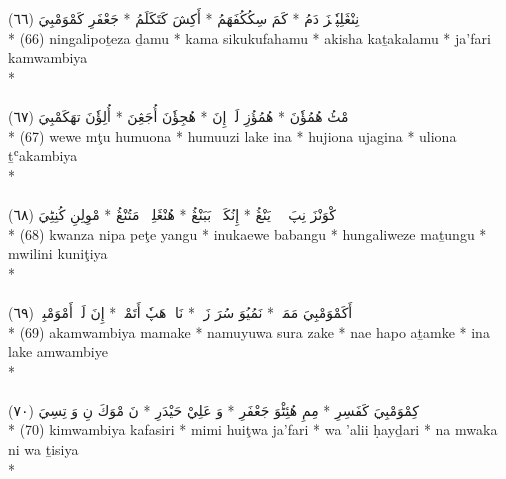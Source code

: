 \documentclass[a4paper, 12pt]{report}
\begin{document}
\begin{center}
\textarabic{(٦٦) \textcolor{mygreen}{نِنْڠَلِپٗتٖزَ دَمُ  * كَمَ سِكُكُفَهَمُ  * أَكِشَ كَتَكَلَمُ  * جَعْفَرِ كَمْوَمْبِيَ }} \\* 
(66) ningalipoṯeza ḏamu  * kama sikukufahamu  * akisha kaṯakalamu  * ja'fari kamwambiya  \\* 
 \\ 
\\[8mm] 

\textarabic{(٦٧) \textcolor{mygreen}{وٖوٖ مْٹُ هُمُؤٗنَ  * هُمُؤُزِ لَكٖ إِنَ  * هُجِؤٗنَ أُجَڠِنَ  * أُلِؤٗنَ تهَكَمْبِيَ }} \\* 
(67) wewe mţu humuona  * humuuzi lake ina  * hujiona ujagina  * uliona ṯʿakambiya  \\* 
 \\ 
\\[8mm] 

\textarabic{(٦٨) \textcolor{mygreen}{كْوَنْزَ نِپَ پٖٹٖ يَنْڠُ  * إِنُكَإٖوٖ بَبَنْڠُ  * هُنْڠَلِوٖزٖ مَتُنْڠُ  * مْوِلِنِ كُنِٹِيَ }} \\* 
(68) kwanza nipa peţe yangu  * inukaewe babangu  * hungaliweze maṯungu  * mwilini kuniţiya  \\* 
 \\ 
\\[8mm] 

\textarabic{(٦٩) \textcolor{mygreen}{أَكَمْوَمْبِيَ مَمَكٖ  * نَمُيُوَ سُرَ زَكٖ  * نَاءٖ هَپٗ أَتَمْكٖ  * إِنَ لَكٖ أَمْوَمْبِيٖ }} \\* 
(69) akamwambiya mamake  * namuyuwa sura zake  * nae hapo aṯamke  * ina lake amwambiye  \\* 
 \\ 
\\[8mm] 

\textarabic{(٧٠) \textcolor{mygreen}{كِمْوَمْبِيَ كَفَسِرِ  * مِمِ هُئِٹْوَ جَعْفَرِ  * وَ عَلِيْ حَيْدَرِ  * نَ مْوَكَ نِ وَ تِسِيَ }} \\* 
(70) kimwambiya kafasiri  * mimi huiţwa ja'fari  * wa 'alii ḥayḏari  * na mwaka ni wa ṯisiya  \\* 
 \\ 
\\[8mm] 


\end{center}
\end{document}
